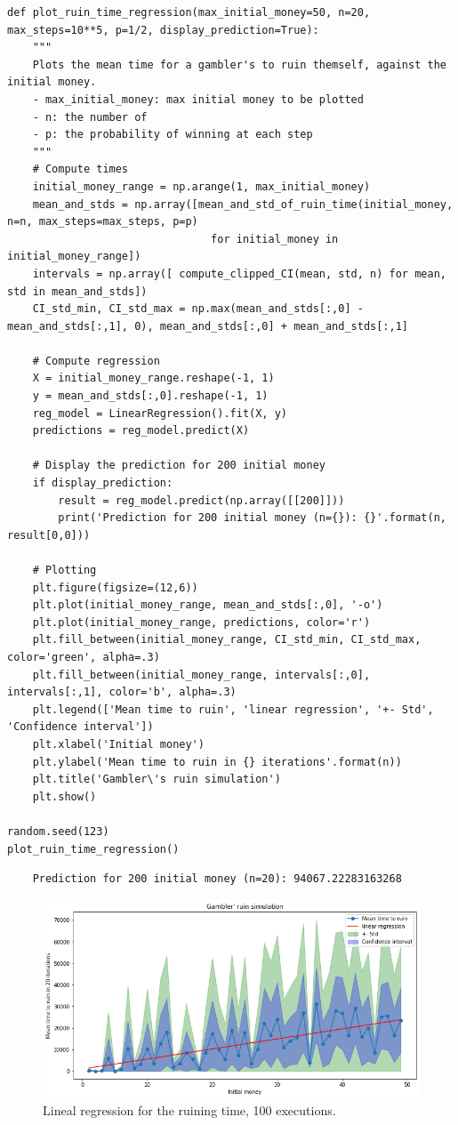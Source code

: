 \documentclass[a4paper]{article}
\begin{document}
\begin{verbatim}
def plot_ruin_time_regression(max_initial_money=50, n=20, max_steps=10**5, p=1/2, display_prediction=True):
	"""
	Plots the mean time for a gambler's to ruin themself, against the initial money.
	- max_initial_money: max initial money to be plotted
	- n: the number of 
	- p: the probability of winning at each step
	"""
	# Compute times
	initial_money_range = np.arange(1, max_initial_money)
	mean_and_stds = np.array([mean_and_std_of_ruin_time(initial_money, n=n, max_steps=max_steps, p=p)
								for initial_money in initial_money_range])
	intervals = np.array([ compute_clipped_CI(mean, std, n) for mean, std in mean_and_stds])
	CI_std_min, CI_std_max = np.max(mean_and_stds[:,0] - mean_and_stds[:,1], 0), mean_and_stds[:,0] + mean_and_stds[:,1]

	# Compute regression
	X = initial_money_range.reshape(-1, 1)
	y = mean_and_stds[:,0].reshape(-1, 1)
	reg_model = LinearRegression().fit(X, y)
	predictions = reg_model.predict(X)
	
	# Display the prediction for 200 initial money
	if display_prediction:
		result = reg_model.predict(np.array([[200]]))
		print('Prediction for 200 initial money (n={}): {}'.format(n, result[0,0]))

	# Plotting
	plt.figure(figsize=(12,6))
	plt.plot(initial_money_range, mean_and_stds[:,0], '-o')
	plt.plot(initial_money_range, predictions, color='r')
	plt.fill_between(initial_money_range, CI_std_min, CI_std_max, color='green', alpha=.3)
	plt.fill_between(initial_money_range, intervals[:,0], intervals[:,1], color='b', alpha=.3)
	plt.legend(['Mean time to ruin', 'linear regression', '+- Std', 'Confidence interval'])
	plt.xlabel('Initial money')
	plt.ylabel('Mean time to ruin in {} iterations'.format(n))
	plt.title('Gambler\'s ruin simulation')
	plt.show()
	
random.seed(123)
plot_ruin_time_regression()
\end{verbatim}

\begin{verbatim}
	Prediction for 200 initial money (n=20): 94067.22283163268
\end{verbatim}

\begin{figure}[H]
	\includegraphics[scale=.6]{figures/gambler3}
	\centering
	\caption{Lineal regression for the ruining time, 100 executions.}
\end{figure}
\end{document}
